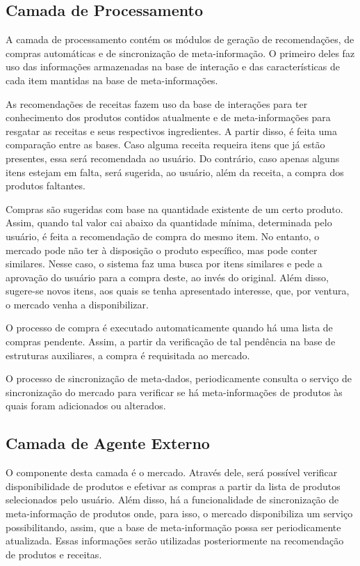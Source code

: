 \subsection{Camada de Processamento}

A camada de processamento contém os módulos de geração de recomendações, de compras automáticas e de sincronização de meta-informação. O primeiro deles faz uso das informações armazenadas na base de interação e das características de cada item mantidas na base de meta-informações.

As recomendações de receitas fazem uso da base de interações para ter conhecimento dos produtos contidos atualmente e de meta-informações para resgatar as receitas e seus respectivos ingredientes. A partir disso, é feita uma comparação entre as bases. Caso alguma receita requeira itens que já estão presentes, essa será recomendada ao usuário. Do contrário, caso apenas alguns itens estejam em falta, será sugerida, ao usuário, além da receita, a compra dos produtos faltantes.

Compras são sugeridas com base na quantidade existente de um certo produto. Assim, quando tal valor cai abaixo da quantidade mínima, determinada pelo usuário, é feita a recomendação de compra do mesmo item. No entanto, o mercado pode não ter à disposição o produto específico, mas pode conter similares. Nesse caso, o sistema faz uma busca por itens similares e pede a aprovação do usuário para a compra deste, ao invés do original. Além disso, sugere-se novos itens, aos quais se tenha apresentado interesse, que, por ventura, o mercado venha a disponibilizar.

O processo de compra é executado automaticamente quando há uma lista de compras pendente. Assim, a partir da verificação de tal pendência na base de estruturas auxiliares, a compra é requisitada ao mercado. 

O processo de sincronização de meta-dados, periodicamente consulta o serviço de sincronização do mercado para verificar se há meta-informações de produtos às quais foram adicionados ou alterados.

\subsection{Camada de Agente Externo}

O componente desta camada é o mercado. Através dele, será possível verificar disponibilidade de produtos e efetivar as compras a partir da lista de produtos selecionados pelo usuário. Além disso, há a funcionalidade de sincronização de meta-informação de produtos onde, para isso, o mercado disponibiliza um serviço possibilitando, assim, que a base de meta-informação possa ser periodicamente atualizada. Essas informações serão utilizadas posteriormente na recomendação de produtos e receitas.


